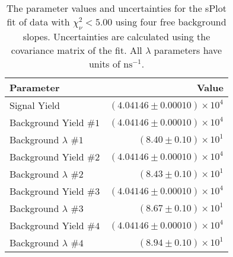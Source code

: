 
\begin{table}[ht]
    \begin{center}
        \begin{tabular}{lr}\toprule
            Parameter & Value \\\midrule
            Signal Yield & $(4.04146 \pm 0.00010) \times 10^{4}$ \\
            Background Yield $\#1$ & $(4.04146 \pm 0.00010) \times 10^{4}$ \\
            Background $\lambda$ $\#1$ & $(8.40 \pm 0.10) \times 10^{1}$ \\
            Background Yield $\#2$ & $(4.04146 \pm 0.00010) \times 10^{4}$ \\
            Background $\lambda$ $\#2$ & $(8.43 \pm 0.10) \times 10^{1}$ \\
            Background Yield $\#3$ & $(4.04146 \pm 0.00010) \times 10^{4}$ \\
            Background $\lambda$ $\#3$ & $(8.67 \pm 0.10) \times 10^{1}$ \\
            Background Yield $\#4$ & $(4.04146 \pm 0.00010) \times 10^{4}$ \\
            Background $\lambda$ $\#4$ & $(8.94 \pm 0.10) \times 10^{1}$ \\\bottomrule
        \end{tabular}
        \caption{The parameter values and uncertainties for the sPlot fit of data with $\chi^2_\nu < 5.00$ using four free background slopes. Uncertainties are calculated using the covariance matrix of the fit. All $\lambda$ parameters have units of $\si{\nano\second}^{-1}$.}\label{tab:splot-fit-results-chisqdof-5.00-free-4}
    \end{center}
\end{table}
